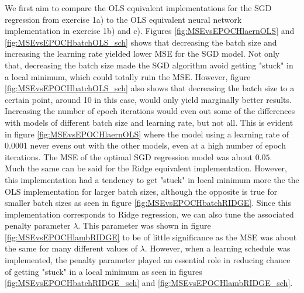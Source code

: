 \documentclass[12pt,a4paper]{article}
\begin{document}
\noindent We first aim to compare the OLS equivalent implementations for the SGD regression from exercise 1a) to the OLS equivalent neural network implementation in exercise 1b) and c). Figures \ref{fig:MSEvsEPOCHlaernOLS} and \ref{fig:MSEvsEPOCHbatchOLS_sch} shows that decreasing the batch size and increasing the learning rate yielded lower MSE for the SGD model. Not only that, decreasing the batch size made the SGD algorithm avoid getting "stuck" in a local minimum, which could totally ruin the MSE. However, figure \ref{fig:MSEvsEPOCHbatchOLS_sch} also shows that decreasing the batch size to a certain point, around 10 in this case, would only yield marginally better results. Increasing the number of epoch iterations would even out some of the differences with models of different batch size and learning rate, but not all. This is evident in figure \ref{fig:MSEvsEPOCHlaernOLS} where the model using a learning rate of $0.0001$ never evens out with the other models, even at a high number of epoch iterations. The MSE of the optimal SGD regression model was about $0.05$.
\\
Much the same can be said for the Ridge equivalent implementation. However, this implementation had a tendency to get "stuck" in local minimum more the the OLS implementation for larger batch sizes, although the opposite is true for smaller batch sizes as seen in figure \ref{fig:MSEvsEPOCHbatchRIDGE}. Since this implementation corresponds to Ridge regression, we can also tune the associated penalty parameter $\lambda$. This parameter was shown in figure \ref{fig:MSEvsEPOCHlambRIDGE} to be of little significance as the MSE was about the same for many different values of $\lambda$. However, when a learning schedule was implemented, the penalty parameter played an essential role in reducing chance of getting "stuck" in a local minimum as seen in figures \ref{fig:MSEvsEPOCHbatchRIDGE_sch} and \ref{fig:MSEvsEPOCHlambRIDGE_sch}. 
\\
\end{document}
